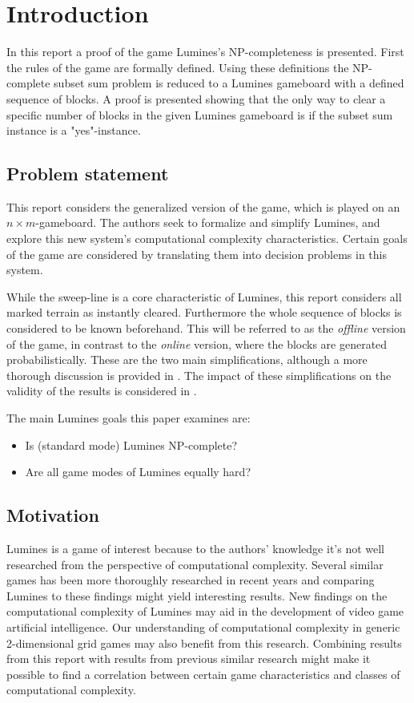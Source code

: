 \section{Introduction}

In this report a proof of the game Lumines's NP-completeness is presented. First the rules of the game are formally defined. Using these definitions the NP-complete subset sum problem is reduced to a Lumines gameboard with a defined sequence of blocks. A proof is presented showing that the only way to clear a specific number of blocks in the given Lumines gameboard is if the subset sum instance is a "yes"-instance.

\subsection{Problem statement}
This report considers the generalized version of the game, which is played on an $n \times m$-gameboard. The authors seek to formalize and  simplify Lumines, and explore this new system's computational complexity characteristics. Certain goals of the game are considered by translating them into decision problems in this system.

While the sweep-line is a core characteristic of Lumines, this report considers all marked terrain as instantly cleared. Furthermore the whole sequence of blocks is considered to be known beforehand. This will be referred to as the \textit{offline} version of the game, in contrast to the \textit{online} version, where the blocks are generated probabilistically. These are the two main simplifications, although a more thorough discussion is provided in . The impact of these simplifications on the validity of the results is considered in .

The main Lumines goals this paper examines are:
\begin{itemize}
        \item Is (standard mode) Lumines NP-complete?
        \item Are all game modes of Lumines equally hard?
\end{itemize}

\subsection{Motivation}

Lumines is a game of interest because to the authors' knowledge it's not well researched from the perspective of computational complexity. Several similar games has been more thoroughly researched in recent years and comparing Lumines to these findings might yield interesting results. New findings on the computational complexity of Lumines may aid in the development of video game artificial intelligence. Our understanding of computational complexity in generic 2-dimensional grid games may also benefit from this research. Combining results from this report with results from previous similar research might make it possible to find a correlation between certain game characteristics and classes of computational complexity.
